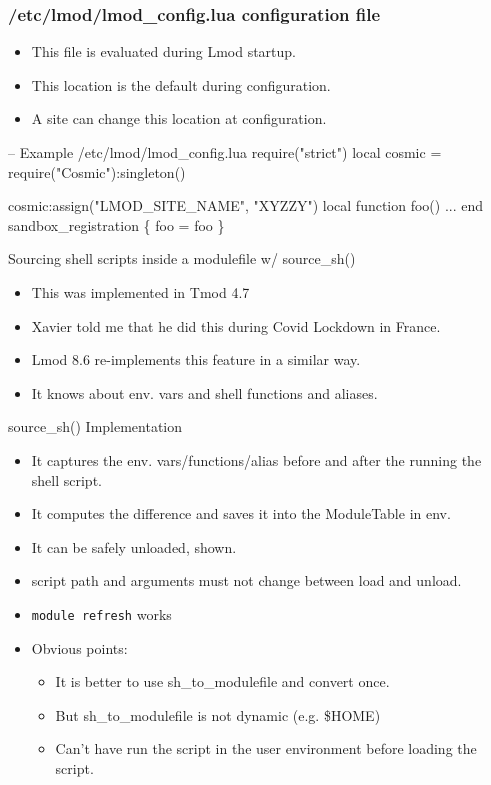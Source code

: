\documentclass{beamer}
\begin{document}
\begin{frame}[fragile]
  \frametitle{/etc/lmod/lmod\_config.lua configuration file}
  \begin{itemize}
    \item This file is evaluated during Lmod startup. 
    \item This location is the default during configuration.
    \item A site can change this location at configuration.
  \end{itemize}
    {\small
\begin{semiverbatim}
-- Example /etc/lmod/lmod\_config.lua
require("strict")
local cosmic = require("Cosmic"):singleton()

cosmic:assign("LMOD\_SITE\_NAME", "XYZZY")
local function foo()
  ...
end
sandbox\_registration \{ foo = foo \}
\end{semiverbatim}
}
\end{frame}

\begin{frame}{Sourcing shell scripts inside a modulefile w/ source\_sh()}
  \begin{itemize}
    \item This was implemented in Tmod 4.7
    \item Xavier told me that he did this during Covid Lockdown in France.
    \item Lmod 8.6 re-implements this feature in a similar way.
    \item It knows about env. vars and shell functions and aliases.
  \end{itemize}
\end{frame}

\begin{frame}{source\_sh() Implementation}
  \begin{itemize}
    \item It captures the env. vars/functions/alias before and after
      the running the shell script.
    \item It computes the difference and saves it into the ModuleTable
      in env.
    \item It can be safely unloaded, shown.
    \item script path and arguments must not change between load and unload.
    \item \texttt{module refresh} works
    \item Obvious points:
      \begin{itemize}
        \item It is better to use sh\_to\_modulefile and convert once.
        \item But sh\_to\_modulefile is not dynamic (e.g. \$HOME)
        \item Can't have run the script in the user environment before
          loading the script.
      \end{itemize}
  \end{itemize}
\end{frame}
\end{document}
